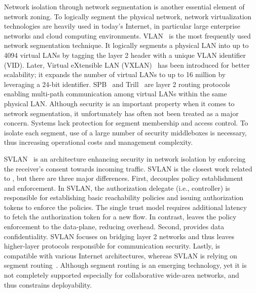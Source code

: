 Network isolation through network segmentation is another essential element of
network zoning. To logically segment the physical network, network
virtualization technologies are heavily used in today's Internet, in particular
large enterprise networks and cloud computing environments.
VLAN~\cite{ieee2018vlan} is the most frequently used network segmentation
technique. It logically segments a physical LAN into up to 4094 virtual LANs by
tagging the layer 2 header with a unique VLAN identifier (VID). Later, Virtual
eXtensible LAN (VXLAN)~\cite{rfc7348} has been introduced for better
scalability; it expands the number of virtual LANs to up to 16 million by
leveraging a 24-bit identifier. SPB~\cite{ieee2012spb} and
Trill~\cite{rfc6325,rfc7176} are layer 2 routing protocols enabling multi-path
communication among virtual LANs within the same physical LAN. Although security
is an important property when it comes to network segmentation, it unfortunately
has often not been treated as a major concern. Systems lack protection for
segment membership and access control. To isolate each segment, use of a large
number of security middleboxes is necessary, thus increasing operational costs
and management complexity.

SVLAN~\cite{kwon2020svlan} is an architecture enhancing security in network
isolation by enforcing the receiver's consent towards incoming traffic. SVLAN is
the closest work related to \name, but there are three major differences. First,
\name decouples policy establishment and enforcement. In SVLAN, the
authorization delegate (i.e., controller) is responsible for establishing basic
reachability policies and issuing authorization tokens to enforce the policies.
The single trust model requires additional latency to fetch the authorization
token for a new flow. In contrast, \name leaves the policy enforcement to the
data-plane, reducing overhead. Second, \name provides data confidentiality.
SVLAN focuses on bridging layer 2 networks and thus leaves higher-layer
protocols responsible for communication security. Lastly, \name is compatible
with various Internet architectures, whereas SVLAN is relying on segment
routing~\cite{rfc8402,rfc8660}. Although segment routing is an emerging
technology, yet it is not completely supported especially for collaborative
wide-area networks, and thus constrains deployability.


